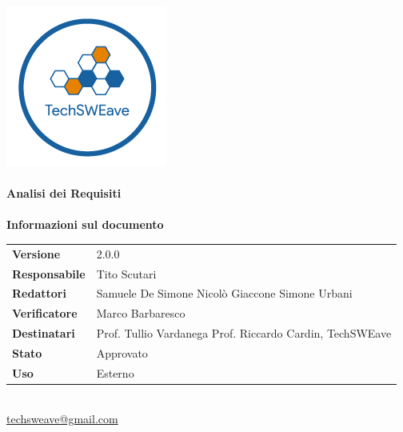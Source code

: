 \documentclass[a4paper]{article}
\begin{document}
\begin{titlepage}
    \begin{center}
        \includegraphics{../../../Images/logo.png}\\
        \vspace{20px}
        \textcolor{logo}{\hrulefill}\\
        \vspace{20px}
        \textbf{\huge\textcolor{logo}{Analisi dei Requisiti}}\\
        \vspace{10px}
        \textcolor{logo}{\hrulefill}\\
        \vspace{40px}
        \textbf{\Large Informazioni sul documento}\\
        \vspace{20px}
        \begin{tabular}{p{100px} | p{100px}}
            \textbf{Versione}     & 2.0.0                                                                      \\
            \textbf{Responsabile} & Tito Scutari                                                               \\
            \textbf{Redattori}    & Samuele De Simone \newline Nicolò Giaccone \newline Simone Urbani          \\
            \textbf{Verificatore} & Marco Barbaresco                                                           \\
            \textbf{Destinatari}  & Prof. Tullio Vardanega \newline Prof. Riccardo Cardin, \newline TechSWEave \\
            \textbf{Stato}        & Approvato                                                                  \\
            \textbf{Uso}          & Esterno                                                                    \\
        \end{tabular}\\
        \vspace{60px}
        \href{mailto:techsweave@gmail.com}{techsweave@gmail.com}\\

    \end{center}
\end{titlepage}
\end{document}
